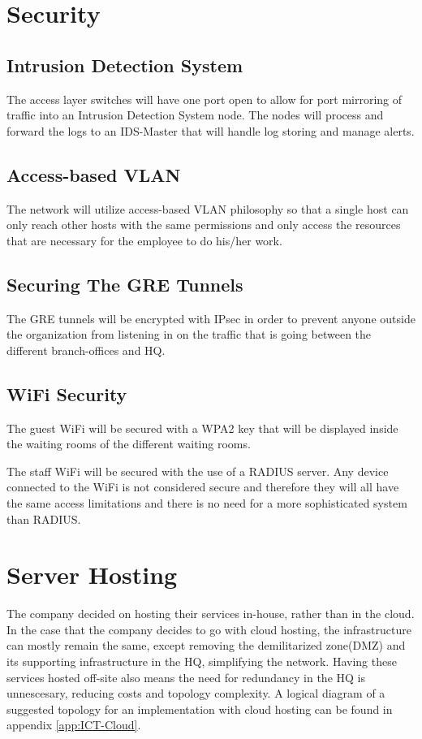 \section{Security}
\subsection{Intrusion Detection System}
The access layer switches will have one port open to allow for port mirroring of traffic into an Intrusion Detection System node. 
The nodes will process and forward the logs to an IDS-Master that will handle log storing and manage alerts.

\subsection{Access-based VLAN}
The network will utilize access-based VLAN philosophy so that a single host can only reach other hosts with the same permissions and only access the resources that are necessary for the employee to do his/her work.

\subsection{Securing The GRE Tunnels}
The GRE tunnels will be encrypted with IPsec in order to prevent anyone outside the organization from listening in on the traffic that is going between the different branch-offices and HQ.

\subsection{WiFi Security}
The guest WiFi will be secured with a WPA2 key that will be displayed inside the waiting rooms of the different waiting rooms.

The staff WiFi will be secured with the use of a RADIUS server. 
Any device connected to the WiFi is not considered secure and therefore they will all have the same access limitations and there is no need for a more sophisticated system than RADIUS.

\section{Server Hosting}
The company decided on hosting their services in-house, rather than in the cloud.
In the case that the company decides to go with cloud hosting, the infrastructure can mostly remain the same, except removing the demilitarized zone(DMZ) and its supporting infrastructure in the HQ, simplifying the network.
Having these services hosted off-site also means the need for redundancy in the HQ is unnescesary, reducing costs and topology complexity.
A logical diagram of a suggested topology for an implementation with cloud hosting can be found in appendix \ref{app:ICT-Cloud}.





